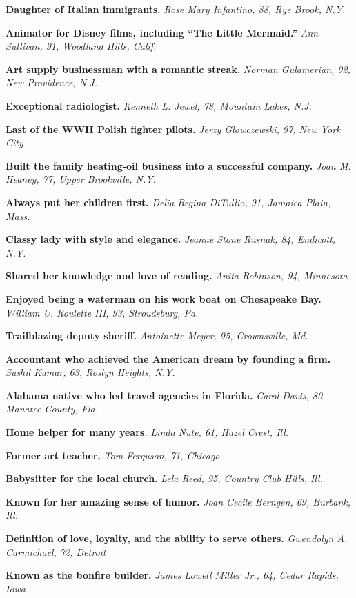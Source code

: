 \textbf{Daughter of Italian immigrants.} \emph{Rose Mary Infantino, 88,
Rye Brook, N.Y.}

\textbf{Animator for Disney films, including ``The Little Mermaid.''}
\emph{Ann Sullivan, 91, Woodland Hills, Calif.}

\textbf{Art supply businessman with a romantic streak.} \emph{Norman
Gulamerian, 92, New Providence, N.J.}

\textbf{Exceptional radiologist.} \emph{Kenneth L. Jewel, 78, Mountain
Lakes, N.J.}

\textbf{Last of the WWII Polish fighter pilots.} \emph{Jerzy
Glowczewski, 97, New York City}

\textbf{Built the family heating-oil business into a successful
company.} \emph{Joan M. Heaney, 77, Upper Brookville, N.Y.}

\textbf{Always put her children first.} \emph{Delia Regina DiTullio, 91,
Jamaica Plain, Mass.}

\textbf{Classy lady with style and elegance.} \emph{Jeanne Stone Rusnak,
84, Endicott, N.Y.}

\textbf{Shared her knowledge and love of reading.} \emph{Anita Robinson,
94, Minnesota}

\textbf{Enjoyed being a waterman on his work boat on Chesapeake Bay.}
\emph{William U. Roulette III, 93, Stroudsburg, Pa.}

\textbf{Trailblazing deputy sheriff.} \emph{Antoinette Meyer, 95,
Crownsville, Md.}

\textbf{Accountant who achieved the American dream by founding a firm.}
\emph{Sushil Kumar, 63, Roslyn Heights, N.Y.}

\textbf{Alabama native who led travel agencies in Florida.} \emph{Carol
Davis, 80, Manatee County, Fla.}

\textbf{Home helper for many years.} \emph{Linda Nute, 61, Hazel Crest,
Ill.}

\textbf{Former art teacher.} \emph{Tom Ferguson, 71, Chicago}

\textbf{Babysitter for the local church.} \emph{Lela Reed, 95, Country
Club Hills, Ill.}

\textbf{Known for her amazing sense of humor.} \emph{Joan Cecile
Berngen, 69, Burbank, Ill.}

\textbf{Definition of love, loyalty, and the ability to serve others.}
\emph{Gwendolyn A. Carmichael, 72, Detroit}

\textbf{Known as the bonfire builder.} \emph{James Lowell Miller Jr.,
64, Cedar Rapids, Iowa}

